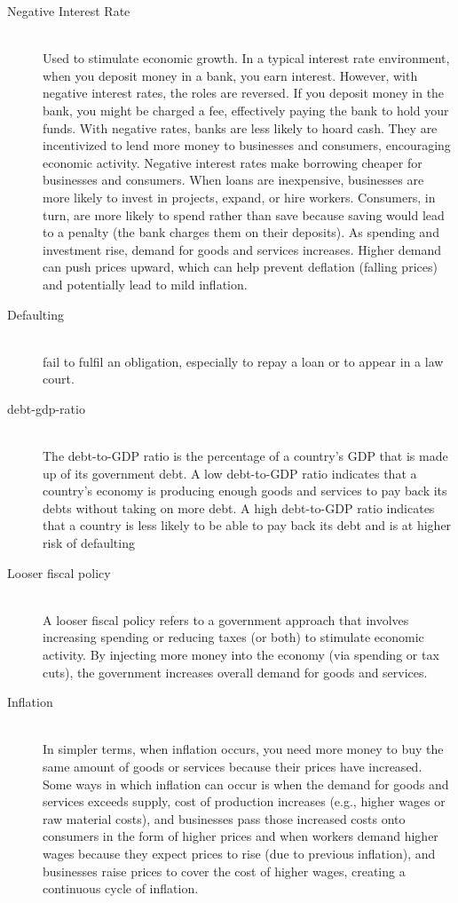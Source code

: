 \begin{description}
    \newpage

    \item[Negative Interest Rate] \hfill \\ Used to stimulate economic growth. In a typical interest rate environment, when you deposit money in a bank, you earn interest. However, with negative interest rates, the roles are reversed. If you deposit money in the bank, you might be charged a fee, effectively paying the bank to hold your funds. With negative rates, banks are less likely to hoard cash. They are incentivized to lend more money to businesses and consumers, encouraging economic activity. Negative interest rates make borrowing cheaper for businesses and consumers. When loans are inexpensive, businesses are more likely to invest in projects, expand, or hire workers. Consumers, in turn, are more likely to spend rather than save because saving would lead to a penalty (the bank charges them on their deposits). As spending and investment rise, demand for goods and services increases. Higher demand can push prices upward, which can help prevent deflation (falling prices) and potentially lead to mild inflation.

    \item[Defaulting] \hfill \\ fail to fulfil an obligation, especially to repay a loan or to appear in a law court.

    \item[debt-gdp-ratio] \hfill \\ The debt-to-GDP ratio is the percentage of a country's GDP that is made up of its government debt. A low debt-to-GDP ratio indicates that a country's economy is producing enough goods and services to pay back its debts without taking on more debt. A high debt-to-GDP ratio indicates that a country is less likely to be able to pay back its debt and is at higher risk of defaulting

    \item[Looser fiscal policy] \hfill \\ A looser fiscal policy refers to a government approach that involves increasing spending or reducing taxes (or both) to stimulate economic activity.  By injecting more money into the economy (via spending or tax cuts), the government increases overall demand for goods and services. 

    \item[Inflation ] \hfill \\ In simpler terms, when inflation occurs, you need more money to buy the same amount of goods or services because their prices have increased. Some ways in which inflation can occur is when the demand for goods and services exceeds supply,  cost of production increases (e.g., higher wages or raw material costs), and businesses pass those increased costs onto consumers in the form of higher prices and  when workers demand higher wages because they expect prices to rise (due to previous inflation), and businesses raise prices to cover the cost of higher wages, creating a continuous cycle of inflation. 

\end{description}